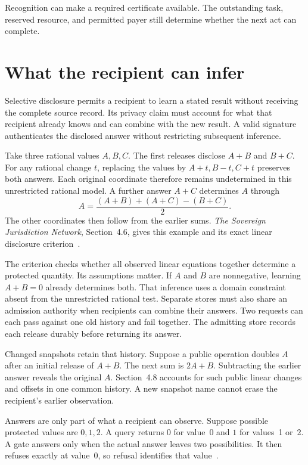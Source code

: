 \documentclass{momentum}
\begin{document}
Recognition can make a required certificate available.
The outstanding task, reserved resource, and permitted payer still determine whether the next act can complete.

\section{What the recipient can infer}
\label{sec:privacy}

Selective disclosure permits a recipient to learn a stated result without receiving the complete source record.
Its privacy claim must account for what that recipient already knows and can combine with the new result.
A valid signature authenticates the disclosed answer without restricting subsequent inference.

Take three rational values $A,B,C$.
The first releases disclose $A+B$ and $B+C$.
For any rational change $t$, replacing the values by $A+t,B-t,C+t$ preserves both answers.
Each original coordinate therefore remains undetermined in this unrestricted rational model.
A further answer $A+C$ determines $A$ through
\[
 A=\frac{(A+B)+(A+C)-(B+C)}{2}.
\]
The other coordinates then follow from the earlier sums.
\emph{The Sovereign Jurisdiction Network}, Section~4.6, gives this example and its exact linear disclosure criterion~\cite{sjn}.

The criterion checks whether all observed linear equations together determine a protected quantity.
Its assumptions matter.
If $A$ and $B$ are nonnegative, learning $A+B=0$ already determines both.
That inference uses a domain constraint absent from the unrestricted rational test.
Separate stores must also share an admission authority when recipients can combine their answers.
Two requests can each pass against one old history and fail together.
The admitting store records each release durably before returning its answer.

Changed snapshots retain that history.
Suppose a public operation doubles $A$ after an initial release of $A+B$.
The next sum is $2A+B$.
Subtracting the earlier answer reveals the original $A$.
Section~4.8 accounts for such public linear changes and offsets in one common history.
A new snapshot name cannot erase the recipient's earlier observation.

Answers are only part of what a recipient can observe.
Suppose possible protected values are $0,1,2$.
A query returns $0$ for value~0 and $1$ for values~1 or~2.
A gate answers only when the actual answer leaves two possibilities.
It then refuses exactly at value~0, so refusal identifies that value~\cite[Section~4.9]{sjn}.
\end{document}

